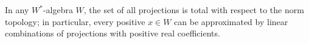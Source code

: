 In any $W^*$-algebra $W$, the set of all projections is total with respect to the norm topology; in particular, every positive $x \in W$ can be approximated by linear combinations of projections with positive real coefficients.
